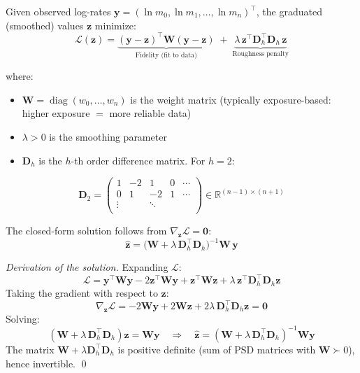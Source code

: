 \documentclass[11pt,a4paper]{article}
\theoremstyle{definition}
\newcommand{\R}{\mathbb{R}}
\begin{document}
\begin{formaldef}
Given observed log-rates $\bm{y} = (\ln m_0, \ln m_1, \ldots, \ln m_n)^\top$,
the graduated (smoothed) values $\bm{z}$ minimize:
\begin{equation}
  \mathcal{L}(\bm{z}) =
  \underbrace{(\bm{y} - \bm{z})^\top \bm{W} (\bm{y} - \bm{z})}_{\text{Fidelity (fit to data)}}
  \;+\;
  \underbrace{\lambda \, \bm{z}^\top \bm{D}_h^\top \bm{D}_h \, \bm{z}}_{\text{Roughness penalty}}
  \label{eq:wh-objective}
\end{equation}

where:
\begin{itemize}
  \item $\bm{W} = \operatorname{diag}(w_0, \ldots, w_n)$ is the weight matrix
    (typically exposure-based: higher exposure $=$ more reliable data)
  \item $\lambda > 0$ is the smoothing parameter
  \item $\bm{D}_h$ is the $h$-th order difference matrix. For $h=2$:
\end{itemize}
\begin{equation}
  \bm{D}_2 = \begin{pmatrix}
    1 & -2 & 1 & 0 & \cdots \\
    0 & 1 & -2 & 1 & \cdots \\
    \vdots & & \ddots & & \\
  \end{pmatrix}
  \in \R^{(n-1) \times (n+1)}
  \label{eq:diff-matrix}
\end{equation}

The closed-form solution follows from $\nabla_{\bm{z}} \mathcal{L} = \bm{0}$:
\begin{equation}
  \boxed{\hat{\bm{z}} = \bigl(\bm{W} + \lambda \, \bm{D}_h^\top \bm{D}_h\bigr)^{-1} \bm{W} \, \bm{y}}
  \label{eq:wh-solution}
\end{equation}
\end{formaldef}

\begin{proof}[Derivation of the solution]
Expanding $\mathcal{L}$:
\[
  \mathcal{L} = \bm{y}^\top\bm{W}\bm{y}
  - 2\bm{z}^\top\bm{W}\bm{y}
  + \bm{z}^\top\bm{W}\bm{z}
  + \lambda\,\bm{z}^\top\bm{D}_h^\top\bm{D}_h\bm{z}
\]
Taking the gradient with respect to $\bm{z}$:
\[
  \nabla_{\bm{z}}\mathcal{L}
  = -2\bm{W}\bm{y} + 2\bm{W}\bm{z} + 2\lambda\,\bm{D}_h^\top\bm{D}_h\bm{z}
  = \bm{0}
\]
Solving:
\[
  (\bm{W} + \lambda\,\bm{D}_h^\top\bm{D}_h)\bm{z} = \bm{W}\bm{y}
  \quad\Longrightarrow\quad
  \hat{\bm{z}} = (\bm{W} + \lambda\,\bm{D}_h^\top\bm{D}_h)^{-1}\bm{W}\bm{y}
\]
The matrix $\bm{W} + \lambda\bm{D}_h^\top\bm{D}_h$ is positive definite
(sum of PSD matrices with $\bm{W} \succ 0$), hence invertible. \qed
\end{proof}
\end{document}
